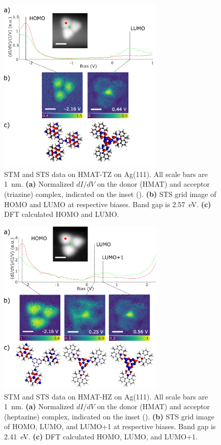 \begin{figure} [H] 
    \centering
    \includegraphics[width=0.7\textwidth]{pictures/HMAT3N_diagram.png}
    \caption{STM and STS data on HMAT-TZ on Ag(111). All scale bars are \SI{1}{nm}. \textbf{(a)} Normalized $dI/dV$ on the donor (HMAT) and acceptor (triazine) complex, indicated on the inset (). \textbf{(b)} STS grid image of HOMO and LUMO at respective biases. Band gap is \SI{2.57}{eV}. \textbf{(c)} DFT calculated HOMO and LUMO.}
    \label{fig:oled:hmat-tz}
\end{figure}

\begin{figure} [H]
    \centering
    \includegraphics[width=0.7\textwidth]{pictures/HMAT7N_diagram.png}
    \caption{STM and STS data on HMAT-HZ on Ag(111). All scale bars are \SI{1}{nm}. \textbf{(a)} Normalized $dI/dV$ on the donor (HMAT) and acceptor (heptazine) complex, indicated on the inset (). \textbf{(b)} STS grid image of HOMO, LUMO, and LUMO+1 at respective biases. Band gap is \SI{2.41}{eV}. \textbf{(c)} DFT calculated HOMO, LUMO, and LUMO+1.}
    \label{fig:oled:hmat-hz}
\end{figure}

